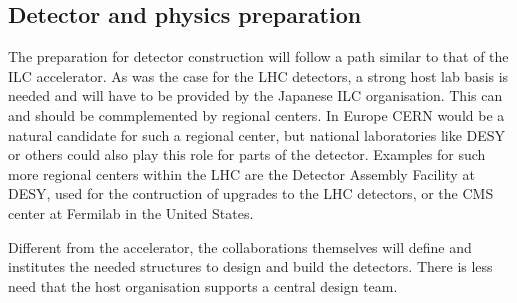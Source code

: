 \documentclass[%
 reprint,
 amsmath,amssymb,
 aps,
]{revtex4-1}
\begin{document}
\subsection{Detector and physics preparation~\label{sec:prepphase:detectors}}
The preparation for detector construction will follow a path similar to that of the \acs{ILC} accelerator.
As was the case for the LHC detectors, a strong host lab basis is needed and will have to be provided by the Japanese ILC organisation.
This can and should be commplemented by regional centers. In Europe CERN would be a natural candidate for such a regional center, but national laboratories like DESY or others could also play this role for parts of the detector. Examples for such more regional centers within the LHC are the Detector Assembly Facility at DESY, used for the contruction of upgrades to the LHC detectors, or the CMS center at Fermilab in the United States. 

Different from the accelerator, the collaborations themselves will define and institutes the needed structures to design and build the detectors. There is less need that the host organisation supports a central design team. 
\end{document}
